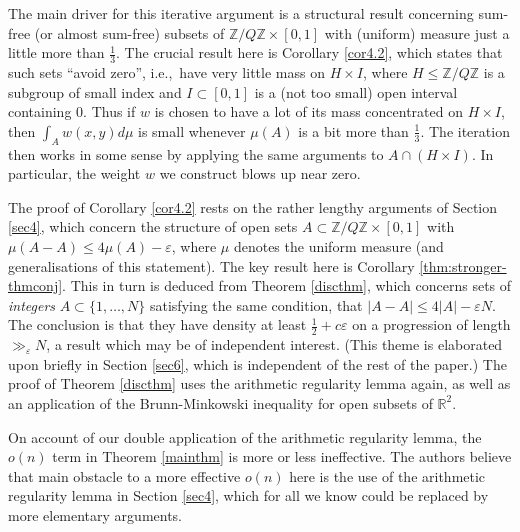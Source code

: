 \documentclass[10pt,reqno]{amsart}
\theoremstyle{definition}
\theoremstyle{remark}
\renewcommand{\leq}{\leqslant}
\def\R{\mathbb{R}}
\def\Z{\mathbb{Z}}
\def\eps{\varepsilon}
\numberwithin{equation}{section}
\begin{document}

The main driver for this iterative argument is a structural result concerning sum-free (or almost sum-free) subsets of $\Z/Q\Z \times [0,1]$ with (uniform) measure just a little more than $\frac{1}{3}$.  The crucial result here is Corollary \ref{cor4.2}, which states that such sets ``avoid zero'', i.e.,~have very little mass on $H \times I$, where $H \leq \Z/Q\Z$ is a subgroup of small index and $I \subset [0,1]$ is a (not too small) open interval containing $0$. Thus if $w$ is chosen to have a lot of its mass concentrated on $H \times I$, then $\int_A w(x, y) d\mu$ is small whenever $\mu(A)$ is a bit more than $\frac{1}{3}$.  The iteration then works in some sense by applying the same arguments to $A \cap (H \times I)$.  In particular, the weight $w$ we construct blows up near zero.

The proof of Corollary \ref{cor4.2} rests on the rather lengthy arguments of Section \ref{sec4}, which concern the structure of open sets $A \subset \Z/Q\Z \times [0,1]$ with $\mu(A - A) \leq 4 \mu(A) - \eps$, where $\mu$ denotes the uniform measure (and generalisations of this statement). The key result here is Corollary \ref{thm:stronger-thmconj}. This in turn is deduced from Theorem \ref{discthm}, which concerns sets of \emph{integers} $A \subset \{1, \dots, N \}$ satisfying the same condition, that $|A - A| \leq 4 |A| - \eps N$. The conclusion is that they have density at least $\frac{1}{2} + c\eps$ on a progression of length $\gg_{\eps} N$, a result which may be of independent interest. (This theme is elaborated upon briefly in Section \ref{sec6}, which is independent of the rest of the paper.) The proof of Theorem \ref{discthm} uses the arithmetic regularity lemma again, as well as an application of the Brunn-Minkowski inequality for open subsets of $\R^2$.

On account of our double application of the arithmetic regularity lemma, the $o(n)$ term in Theorem \ref{mainthm} is more or less ineffective. The authors believe that main obstacle to a more effective $o(n)$ here is the use of the arithmetic regularity lemma in Section \ref{sec4}, which for all we know could be replaced by more elementary arguments.
\end{document}
